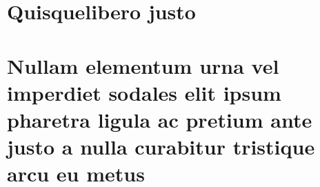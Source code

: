 
\begin{apendicesenv}

\partapendices

\chapter{Quisquelibero justo}

\lipsum[50]

\chapter{Nullam elementum urna vel imperdiet sodales elit ipsum pharetra ligula
ac pretium ante justo a nulla curabitur tristique arcu eu metus}
\lipsum[55-57]

\end{apendicesenv}

